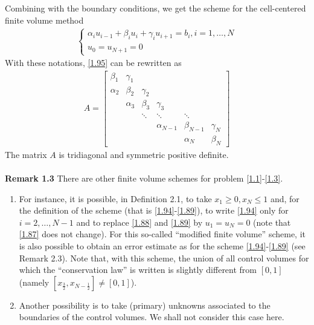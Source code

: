 \documentclass[a4paper]{article}
\numberwithin{equation}{section}
\begin{document}
Combining with the boundary conditions, we get the scheme for the cell-centered finite volume method
\begin{align}
\left\{ {\begin{array}{*{20}{c}}
{{\alpha _i}{u_{i - 1}} + {\beta _i}{u_i} + {\gamma _i}{u_{i + 1}} = {b_i},i = 1, \ldots ,N}\\
{{u_0} = {u_{N + 1}} = 0}
\end{array}} \right.
\end{align}
With these notations, \eqref{1.95} can be rewritten as
\begin{align}
A = \left[ {\begin{array}{*{20}{c}}
{{\beta _1}}&{{\gamma _1}}&{}&{}&{}&{}\\
{{\alpha _2}}&{{\beta _2}}&{{\gamma _2}}&{}&{}&{}\\
{}&{{\alpha _3}}&{{\beta _3}}&{{\gamma _3}}&{}&{}\\
{}&{}& \ddots & \ddots & \ddots &{}\\
{}&{}&{}&{{\alpha _{N - 1}}}&{{\beta _{N - 1}}}&{{\gamma _N}}\\
{}&{}&{}&{}&{{\alpha _N}}&{{\beta _N}}
\end{array}} \right]
\end{align}
The matrix $A$ is tridiagonal and symmetric positive definite.\\
\\
\textbf{Remark 1.3} There are other finite volume schemes for problem \eqref{1.1}-\eqref{1.3}.
\begin{enumerate}
\item For instance, it is possible, in Definition 2.1, to take $x_1\ge 0,x_N\le 1$ and, for the definition of the scheme (that is \eqref{1.94}-\eqref{1.89}), to write \eqref{1.94} only for $i=2,\ldots,N-1$ and to replace \eqref{1.88} and \eqref{1.89} by $u_1=u_N=0$ (note that \eqref{1.87} does not change). For this so-called ``modified finite volume'' scheme, it is also possible to obtain an error estimate as for the scheme \eqref{1.94}-\eqref{1.89} (see Remark 2.3). Note that, with this scheme, the union of all control volumes for which the ``conservation law'' is written is slightly different from $\left[0,1\right]$ (namely $\left[ {{x_{\frac{3}{2}}},{x_{N - \frac{1}{2}}}} \right] \ne \left[ {0,1} \right]$).
\item Another possibility is to take (primary) unknowns associated to the boundaries of the control volumes. We shall not consider this case here.
\end{enumerate}
\end{document}
